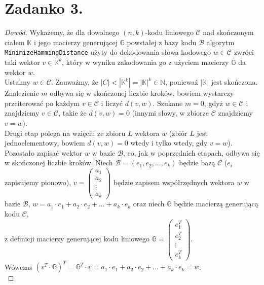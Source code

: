 \documentclass[10pt]{article} %
\begin{document}
\section*{Zadanko 3.}
\begin{proof}[Dowód]
Wykażemy, że dla dowolnego $(n,k)$-kodu liniowego $\mathcal{C}$ nad skończonym ciałem $\mathbb{K}$ i jego macierzy generującej $\mathbb{G}$ powstałej z bazy kodu $\mathcal{B}$ algorytm \verb|MinimizeHammingDistance| użyty do dekodowania słowa kodowego $w \in \mathcal{C}$ zwróci taki wektor $v \in \mathbb{K}^k$, który w wyniku zakodowania go z użyciem macierzy $\mathbb{G}$ da wektor $w$.\\ Ustalmy $w \in \mathcal{C}$. Zauważmy, że $|C| < |\mathbb{K}^k| = |\mathbb{K}|^k \in \mathbb{N}$, ponieważ $|\mathbb{K}|$ jest skończona. Znalezienie $m$ odbywa się w skończonej liczbie kroków, bowiem wystarczy przeiterować po każdym $v \in \mathcal{C}$ i liczyć $d(v,w)$. Szukane $m=0$, gdyż $w \in \mathcal{C}$ i znajdziemy $v \in \mathcal{C}$, takie że $d(v,w) = 0$ (innymi słowy, w zbiorze $\mathcal{C}$ znajdziemy $v=w$). \\
Drugi etap polega na wzięciu ze zbioru $L$ wektora $w$ (zbiór $L$ jest jednoelementowy, bowiem $d(v,w) = 0$ wtedy i tylko wtedy, gdy $v=w$). \\
Pozostało zapisać wektor $w$ w bazie $\mathcal{B}$, co, jak w poprzednich etapach, odbywa się w skończonej liczbie kroków. Niech  $\mathcal{B} = (e_1, e_2, ..., e_k)$ będzie bazą $\mathcal{C}$ ($e_i$ zapisujemy pionowo), $v = \begin{pmatrix} a_1\\a_2\\\vdots\\a_k\end{pmatrix}$ będzie zapisem współrzędnych wektora $w$ w bazie $\mathcal{B}$, $w = a_1\cdot e_1 + a_2\cdot e_2 + ... + a_k\cdot e_k$ oraz niech $\mathbb{G}$ będzie macierzą generującą kodu $\mathcal{C}$,\\ z definicji macierzy generującej kodu liniowego $\mathbb{G} =\begin{pmatrix} e_1^T\\e_2^T\\\vdots\\e_k^T\end{pmatrix} $. \\
Wówczas  $ (v^T \cdot \mathbb{G})^T =  \mathbb{G}^T \cdot v = a_1\cdot e_1 + a_2\cdot e_2 + ... + a_k\cdot e_k = w$.\\
\end{proof}
\end{document}
